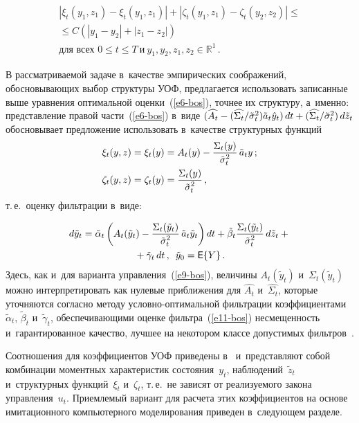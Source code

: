 \begin{multicols}{2}
\vspace*{-12pt}

\noindent
\begin{multline*}
\left\vert \xi_t (y_1,z_1)-\xi_t(y_1,z_1)\right\vert +\left\vert 
\zeta_t(y_1,z_1)-\zeta_t(y_2,z_2)\right\vert \leq{}\\[1pt]
{}\leq C\left( \left\vert y_1-y_2\right\vert 
+\left\vert z_1-z_2\right\vert \right)\\[1pt]
 \mbox{для\ всех }0\leq t\leq T\ 
\mbox{и}\ y_1, y_2, z_1, z_2\in\mathbb{R}^1\,.
\end{multline*}
     
     В рассматриваемой задаче в~качестве эмпирических соображений, 
обосновывающих выбор структуры УОФ, предлагается использовать 
записанные выше уравнения оптимальной оценки~(\ref{e6-bos}), точнее их 
структуру, а~именно: представление правой час\-ти~(\ref{e6-bos}) в~виде 
$(\widehat{A_t}\hm- (\widehat{\Sigma_t}/\tilde{\sigma}_t^2)
\tilde{a}_t\hat{y}_t)\,dt\hm+ 
(\widehat{\Sigma_t}/\tilde{\sigma}_t^2)\,d\tilde{z}_t$ обосно\-вы\-ва\-ет 
предложение использовать в~качестве структурных функций 
\begin{align*}
\xi_t(y,z)&=\xi_t(y)= A_t(y)-
\displaystyle\frac{\displaystyle \Sigma_t(y)\mathstrut}{\displaystyle \tilde{\sigma}_t^2\mathstrut}\,\tilde{a}_t y\,;\\ 
\zeta_t(y,z)&= \zeta_t(y)= \displaystyle\frac{\displaystyle \Sigma_t(y)\mathstrut}{\displaystyle \tilde{\sigma}_t^2\mathstrut}\,,
\end{align*}
 т.\,е.\ 
оценку фильтрации в~виде:

\noindent
     \begin{multline}
d\tilde{y}_t= \tilde{\alpha}_t\left( A_t(\tilde{y}_t) - 
\displaystyle\frac{\displaystyle \Sigma_t(\tilde{y}_t)\mathstrut}{\displaystyle \tilde{\sigma}_t^2\mathstrut}\,\tilde{a}_t\tilde{y}_t\right) dt 
+\tilde{\beta}_t 
\displaystyle\frac{\displaystyle \Sigma_t(\tilde{y}_t)\mathstrut}{\displaystyle \tilde{\sigma}_t^2\mathstrut}\,d\tilde{z}_t+{}\\
{}+\tilde{\gamma}_t\,dt\,,\enskip \tilde{y}_0={\sf E}\{Y\}\,.
     \label{e11-bos}
     \end{multline} 
     Здесь, как и~для варианта управления~(\ref{e9-bos}), величины 
$A_t(\tilde{y}_t)$ и~$\Sigma_t(\tilde{y}_t)$ можно интерпретировать как нулевые 
приближения для $\widehat{A_t}$ и~$\widehat{\Sigma_t}$, которые уточняются 
согласно методу услов\-но-оп\-ти\-маль\-ной фильт\-ра\-ции коэффициентами 
$\tilde{\alpha}_t$, $\tilde{\beta}_t$ и~$\tilde{\gamma}_t$, обеспечивающими оценке 
фильтра~(\ref{e11-bos}) несмещенность и~гарантированное качество, лучшее 
на некотором классе допустимых фильтров~\cite{8-bos}.
     
     Соотношения для коэффициентов УОФ приведены в~\cite{8-bos} 
и~представляют собой комбинации моментных характеристик 
состояния~$y_t$, наблюдений~$\tilde{z}_t$ и~структурных функций~$\xi_t$ 
и~$\zeta_t$, т.\,е.\ не зависят от реализуемого закона управления~$u_t$. 
Приемлемый вариант для расчета этих коэффициентов на основе 
имитационного компьютерного моделирования приведен в~следующем 
разделе.


\end{multicols}

